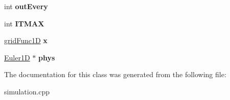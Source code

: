 \begin{DoxyCompactItemize}
\item 
\hypertarget{class_simulation_a2b9ba6896919e029f314cafdd0f496ac}{int {\bfseries out\-Every}}\label{class_simulation_a2b9ba6896919e029f314cafdd0f496ac}

\item 
\hypertarget{class_simulation_a592c3b6538cbd268fc31aa806cdddef5}{int {\bfseries I\-T\-M\-A\-X}}\label{class_simulation_a592c3b6538cbd268fc31aa806cdddef5}

\item 
\hypertarget{class_simulation_adb5a7b5d86b920135fb2bf2a0d9516e0}{\hyperlink{classgrid_func1_d}{grid\-Func1\-D} {\bfseries x}}\label{class_simulation_adb5a7b5d86b920135fb2bf2a0d9516e0}

\item 
\hypertarget{class_simulation_a801473291b7cf8bf290192383db659e1}{\hyperlink{class_euler1_d}{Euler1\-D} $\ast$ {\bfseries phys}}\label{class_simulation_a801473291b7cf8bf290192383db659e1}

\end{DoxyCompactItemize}


The documentation for this class was generated from the following file\-:\begin{DoxyCompactItemize}
\item 
simulation.\-cpp\end{DoxyCompactItemize}

